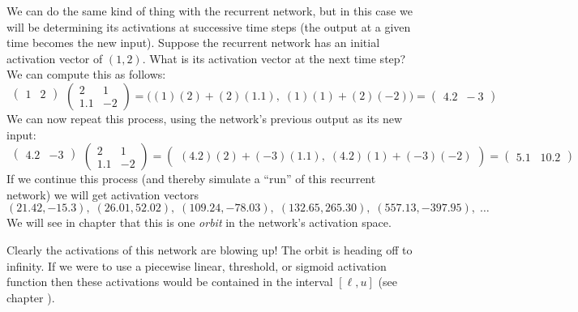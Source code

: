 We can do the same kind of thing with the recurrent network, but in this case we will be determining its activations at successive time steps (the output at a given time becomes the new input). Suppose the recurrent network has an initial activation vector of $(1,2)$. What is its activation vector at the next time step?  We can compute this as follows:
\[
  \begin{matrix}\begin{pmatrix}1 & 2\end{pmatrix}\\\mbox{}\end{matrix}
  \begin{pmatrix}  2  &   1 \\  1.1  & -2  \end{pmatrix} 
  =
  \big((1)(2) + (2)(1.1) ,\; (1)(1) + (2)(-2)\big)
  =
  \begin{pmatrix}  4.2 \;\; -3 \end{pmatrix}
\]
We can now repeat this process, using the network's previous output as its new input:
\[
  \begin{matrix}\begin{pmatrix}4.2 & -3\end{pmatrix}\\\mbox{}\end{matrix}
  \begin{pmatrix}  2  &   1 \\  1.1  & -2  \end{pmatrix} 
  =
  \begin{pmatrix} (4.2)(2)+( -3)(1.1) ,\;(4.2)(1) + (-3)(-2)\end{pmatrix}
  =
  \begin{pmatrix}  5.1 \;\;\; 10.2 \end{pmatrix}
\]
If we continue this process (and thereby simulate a ``run'' of this recurrent network) we will get activation vectors 
\begin{equation*}
(21.42, -15.3 ),\; (26.01,  52.02),\; (109.24,  -78.03 ),\; (132.65,  265.30), 
\; (557.13, -397.95 ), \; \dots
\end{equation*}
We will see in chapter  that this is one \emph{orbit} in the network's activation space.

 Clearly the activations of this network are blowing up!  The orbit is heading off to infinity. If we were to use a piecewise linear, threshold, or sigmoid activation function then these  activations would be contained in the interval $[\ell,u]$ (see chapter ).

